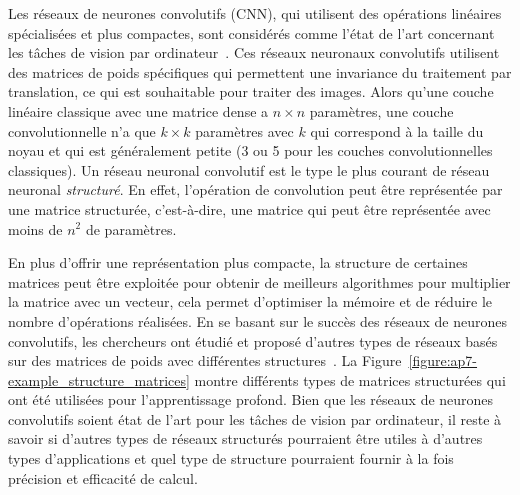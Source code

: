 Les réseaux de neurones convolutifs (CNN), qui utilisent des opérations linéaires spécialisées et plus compactes, sont considérés comme l'état de l'art concernant les tâches de vision par ordinateur~\cite{lecun1998gradient,krizhevsky2012imagenet,he2016deep,tan2019efficientnet}. 
Ces réseaux neuronaux convolutifs utilisent des matrices de poids spécifiques qui permettent une invariance du traitement par translation, ce qui est souhaitable pour traiter des images.
Alors qu'une couche linéaire classique avec une matrice dense a $n \times n$ paramètres, une couche convolutionnelle n'a que $k \times k$ paramètres avec $k$ qui correspond à la taille du noyau et qui est généralement petite (3 ou 5 pour les couches convolutionnelles classiques).
Un réseau neuronal convolutif est le type le plus courant de réseau neuronal \emph{structuré}.
En effet, l'opération de convolution peut être représentée par une matrice structurée, c'est-à-dire, une matrice qui peut être représentée avec moins de $n^2$ de paramètres.



En plus d'offrir une représentation plus compacte, la structure de certaines matrices peut être exploitée pour obtenir de meilleurs algorithmes pour multiplier la matrice avec un vecteur, cela permet d'optimiser la mémoire et de réduire le nombre d'opérations réalisées.
En se basant sur le succès des réseaux de neurones convolutifs, les chercheurs ont étudié et proposé d'autres types de réseaux basés sur des matrices de poids avec différentes structures~\cite{moczulski2016acdc,sindhwani2015structured}.
La Figure~\ref{figure:ap7-example_structure_matrices} montre différents types de matrices structurées qui ont été utilisées pour l'apprentissage profond.
Bien que les réseaux de neurones convolutifs soient état de l'art pour les tâches de vision par ordinateur, il reste à savoir si d'autres types de réseaux structurés pourraient être utiles à d'autres types d'applications et quel type de structure pourraient fournir à la fois précision et efficacité de calcul.


